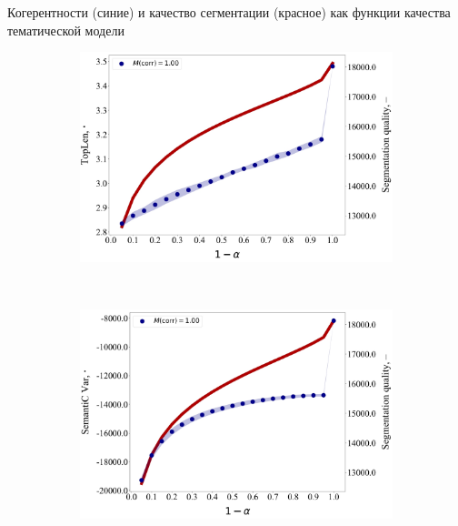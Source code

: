 \documentclass[sans, mathsans, russian]{beamer}
\begin{document}
\begin{frame}{Когерентности (синие) и качество сегментации (красное) как функции качества тематической модели}
\begin{figure}[h]
\begin{subfigure}[t]{0.48\textwidth}
      \includegraphics[width=\linewidth]{toplen-iteration.jpg}
    \end{subfigure}
    ~
    \begin{subfigure}[t]{0.48\textwidth}
      \includegraphics[width=\linewidth]{semantic_var-iteration.jpg}
    \end{subfigure}
  \end{figure}
\end{frame}
\end{document}
